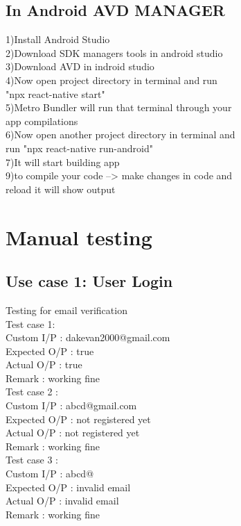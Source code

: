 \documentclass[conference]{IEEEtran}
\begin{document}
\subsection{In Android AVD MANAGER}
1)Install Android Studio\\
2)Download SDK managers tools in android studio\\
3)Download AVD in indroid studio\\
4)Now open project directory in terminal and run \\
"npx react-native start"\\
5)Metro Bundler will run that terminal through your\\
app compilations \\
6)Now open another project directory in terminal and \\
run "npx react-native run-android"\\
7)It will start building app\\
9)to compile your code --> make changes in code and \\
reload it will show output\\


\section{Manual testing}
\subsection{Use case 1: User Login}
Testing for email verification\\
Test case 1:\\
Custom I/P : dakevan2000@gmail.com\\
Expected O/P : true\\
Actual O/P : true\\
Remark : working fine\\
Test case 2 :\\
Custom I/P : abcd@gmail.com\\
Expected O/P : not registered yet\\
Actual O/P : not registered yet\\
Remark : working fine\\
Test case 3 :\\
Custom I/P : abcd@\\
Expected O/P : invalid email\\
Actual O/P : invalid email\\
Remark : working fine\\
\\
\end{document}
